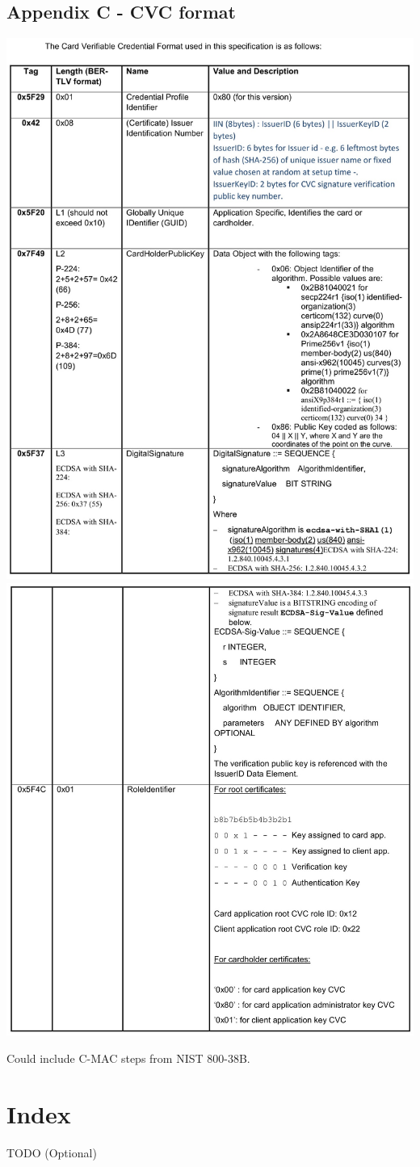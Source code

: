 \documentclass[12pt]{article}
\begin{document}
\subsection{Appendix C - CVC format}
\includegraphics[scale=0.4]{appendix/cvc-1}\\
\includegraphics[scale=0.4]{appendix/cvc-2}

Could include C-MAC steps from NIST 800-38B.

\pagebreak

\section{Index}
TODO (Optional)
\pagebreak
\end{document}
